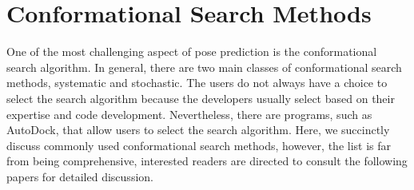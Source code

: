 \chapter*{Conformational Search Methods}
One of the most challenging aspect of pose prediction is the conformational search algorithm. In general, there are two main classes of conformational search methods, systematic and stochastic.  The users do not always have a choice to select the search algorithm because the developers usually select based on their expertise and code development. Nevertheless, there are programs, such as AutoDock\cite{bib22}, that allow users to select the search algorithm. Here, we succinctly discuss commonly used conformational search methods, however, the list is far from being comprehensive, interested readers are directed to consult the following papers for detailed discussion\cite{bib17, bib23}. 


